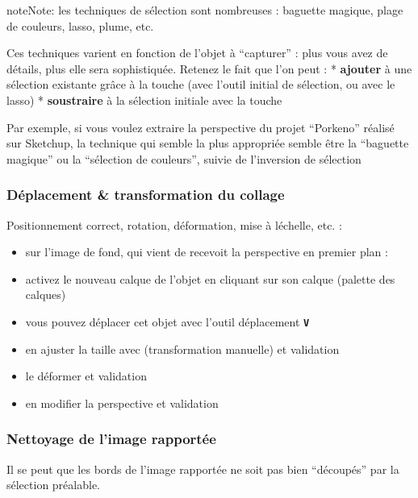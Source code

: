 \documentclass[a4paper,12pt,french]{sphinxmanual}
\begin{document}
\begin{notice}{note}{Note:}
les techniques de sélection sont nombreuses : baguette magique, plage de couleurs, lasso, plume, etc.

Ces techniques varient en fonction de l'objet à ``capturer'' : plus vous avez de détails, plus elle sera sophistiquée. Retenez le fait que l'on peut :
* \textbf{ajouter} à une sélection existante grâce à la touche  (avec l'outil initial de sélection, ou avec le lasso)
* \textbf{soustraire} à la sélection initiale avec la touche 

Par exemple, si vous voulez extraire la perspective du projet ``Porkeno'' réalisé sur Sketchup, la technique qui semble la plus appropriée semble être la ``baguette magique'' ou la ``sélection de couleurs'', suivie de l'inversion de sélection
\end{notice}


\subsubsection{Déplacement \& transformation du collage}
\label{psd/insertion:deplacement-transformation-du-collage}
Positionnement correct, rotation, déformation, mise à léchelle, etc. :
\begin{itemize}
\item {} 
sur l'image de fond, qui vient de recevoit la perspective en premier plan :

\item {} 
activez le nouveau calque de l'objet en cliquant sur son calque (palette des calques)

\item {} 
vous pouvez déplacer cet objet avec l'outil déplacement \textbf{\texttt{V}}

\item {} 
en ajuster la taille avec  (transformation manuelle) et validation

\item {} 
le déformer  et validation

\item {} 
en modifier la perspective  et validation

\end{itemize}


\subsubsection{Nettoyage de l'image rapportée}
\label{psd/insertion:nettoyage-de-l-image-rapportee}
Il se peut que les bords de l'image rapportée ne soit pas bien ``découpés'' par la sélection préalable.
\end{document}
